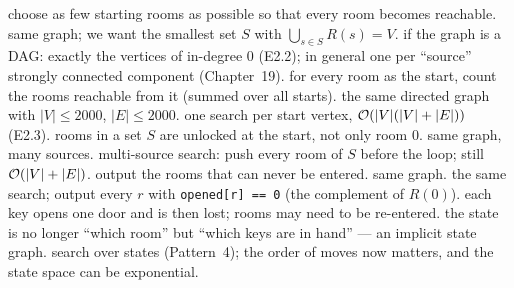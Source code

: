 \begin{variantsbox}
  {choose as few starting rooms as possible so that every room becomes reachable.}
  {same graph; we want the smallest set $S$ with $\bigcup_{s\in S} R(s) = V$.}
  {if the graph is a DAG: exactly the vertices of in-degree 0 (E2.2); in general one per ``source'' strongly connected component (Chapter~19).}
  {for every room as the start, count the rooms reachable from it (summed over all starts).}
  {the same directed graph with $|V| \le 2000$, $|E| \le 2000$.}
  {one search per start vertex, $\mathcal{O}(|V|(|V|+|E|))$ (E2.3).}
  {rooms in a set $S$ are unlocked at the start, not only room 0.}
  {same graph, many sources.}
  {multi-source search: push every room of $S$ before the loop; still $\mathcal{O}(|V|+|E|)$.}
  {output the rooms that can never be entered.}
  {same graph.}
  {the same search; output every $r$ with \texttt{opened[r] == 0} (the complement of $R(0)$).}
  {each key opens one door and is then lost; rooms may need to be re-entered.}
  {the state is no longer ``which room'' but ``which keys are in hand'' --- an implicit state graph.}
  {search over states (Pattern~4); the order of moves now matters, and the state space can be exponential.}
\end{variantsbox}

